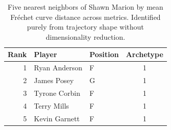 \begin{table}[htbp]
  \centering\small
  \begin{tabular}{rllc}
    \toprule
    Rank & Player & Position & Archetype \\
    \midrule
    1 & Ryan Anderson & F & 1 \\
    2 & James Posey & G & 1 \\
    3 & Tyrone Corbin & F & 1 \\
    4 & Terry Mills & F & 1 \\
    5 & Kevin Garnett & F & 1 \\
    \bottomrule
  \end{tabular}
  \caption{Five nearest neighbors of Shawn Marion by mean Fr\'{e}chet curve distance across metrics. Identified purely from trajectory shape without dimensionality reduction.}
  \label{tab:Shawn_Marion_frechet_curve_neighbors}
\end{table}

